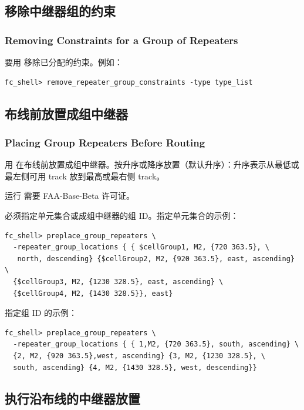 \subsection{移除中继器组的约束}
\subsubsection*{Removing Constraints for a Group of Repeaters}

要用  移除已分配的约束。例如：
\begin{lstlisting}
fc_shell> remove_repeater_group_constraints -type type_list
\end{lstlisting}

\subsection{布线前放置成组中继器}
\subsubsection*{Placing Group Repeaters Before Routing}

用  在布线前放置成组中继器。按升序或降序放置（默认升序）：升序表示从最低或最左侧可用 track 放到最高或最右侧 track。

\begin{noteBox}
运行  需要 FAA-Base-Beta 许可证。
\end{noteBox}

必须指定单元集合或成组中继器的组 ID。指定单元集合的示例：
\begin{lstlisting}
fc_shell> preplace_group_repeaters \
  -repeater_group_locations { { $cellGroup1, M2, {720 363.5}, \
   north, descending} {$cellGroup2, M2, {920 363.5}, east, ascending} \
  {$cellGroup3, M2, {1230 328.5}, east, ascending} \
  {$cellGroup4, M2, {1430 328.5}}, east}
\end{lstlisting}

指定组 ID 的示例：
\begin{lstlisting}
fc_shell> preplace_group_repeaters \
  -repeater_group_locations { { 1,M2, {720 363.5}, south, ascending} \
  {2, M2, {920 363.5},west, ascending} {3, M2, {1230 328.5}, \
  south, ascending} {4, M2, {1430 328.5}, west, descending}}
\end{lstlisting}

\subsection{执行沿布线的中继器放置}
